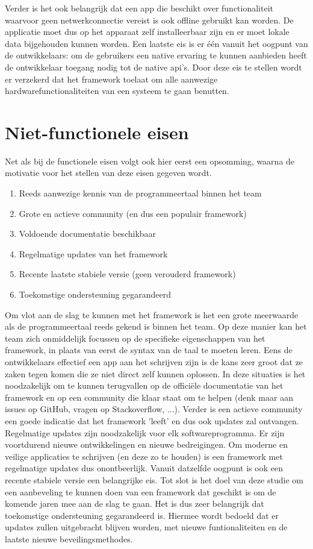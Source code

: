 Verder is het ook belangrijk dat een app die beschikt over functionaliteit waarvoor geen netwerkconnectie vereist is ook offline gebruikt kan worden. De applicatie moet dus op het apparaat zelf installeerbaar zijn en er moet lokale data bijgehouden kunnen worden. Een laatste eis is er één vanuit het oogpunt van de ontwikkelaars: om de gebruikers een native ervaring te kunnen aanbieden heeft de ontwikkelaar toegang nodig tot de native api's. Door deze eis te stellen wordt er verzekerd dat het framework toelaat om alle aanwezige hardwarefunctionaliteiten van een systeem te gaan benutten.

\section{Niet-functionele eisen}
\label{sec:nietFunctioneleEisen}

Net als bij de functionele eisen volgt ook hier eerst een opsomming, waarna de motivatie voor het stellen van deze eisen gegeven wordt.

\begin{enumerate}
    \item Reeds aanwezige kennis van de programmeertaal binnen het team
    \item Grote en actieve community (en dus een populair framework)
    \item Voldoende documentatie beschikbaar
    \item Regelmatige updates van het framework
    \item Recente laatste stabiele versie (geen verouderd framework)
    \item Toekomstige ondersteuning gegarandeerd    
\end{enumerate}

Om vlot aan de slag te kunnen met het framework is het een grote meerwaarde als de programmeertaal reeds gekend is binnen het team. Op deze manier kan het team zich onmiddelijk focussen op de specifieke eigenschappen van het framework, in plaats van eerst de syntax van de taal te moeten leren. Eens de ontwikkelaars effectief een app aan het schrijven zijn is de kans zeer groot dat ze zaken tegen komen die ze niet direct zelf kunnen oplossen. In deze situaties is het noodzakelijk om te kunnen terugvallen op de officiële documentatie van het framework en op een community die klaar staat om te helpen (denk maar aan issues op GitHub, vragen op Stackoverflow, ...). Verder is een actieve community een goede indicatie dat het framework 'leeft' en dus ook updates zal ontvangen. Regelmatige updates zijn noodzakelijk voor elk softwareprogramma. Er zijn voortdurend nieuwe ontwikkelingen en nieuwe bedreigingen. Om moderne en veilige applicaties te schrijven (en deze zo te houden) is een framework met regelmatige updates dus onontbeerlijk. Vanuit datzelfde oogpunt is ook een recente stabiele versie een belangrijke eis. Tot slot is het doel van deze studie om een aanbeveling te kunnen doen van een framework dat geschikt is om de komende jaren mee aan de slag te gaan. Het is dus zeer belangrijk dat toekomstige ondersteuning gegarandeerd is. Hiermee wordt bedoeld dat er updates zullen uitgebracht blijven worden, met nieuwe funtionaliteiten en de laatste nieuwe beveilingsmethodes.